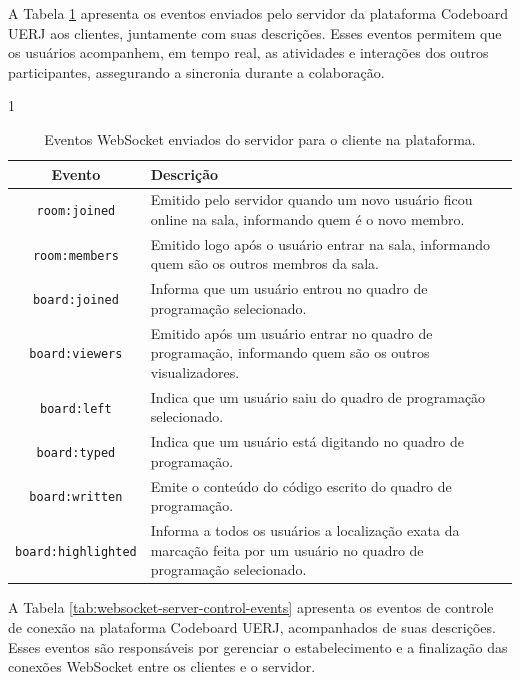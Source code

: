 A Tabela \ref{tab:websocket-server-to-client-events} apresenta os eventos enviados pelo servidor da plataforma Codeboard UERJ aos clientes, juntamente com suas descrições. Esses eventos permitem que os usuários acompanhem, em tempo real, as atividades e interações dos outros participantes, assegurando a sincronia durante a colaboração.

\begin{table}[H]{1\textwidth}
    \centering
    \caption{Eventos WebSocket enviados do servidor para o cliente na plataforma.}
    \label{tab:websocket-server-to-client-events}
    \renewcommand{\arraystretch}{1.3} 
    \begin{tabular}{|c|p{10cm}|}
        \hline
        \textbf{Evento} & \textbf{Descrição} \\
        \hline
        \texttt{room:joined} & Emitido pelo servidor quando um novo usuário ficou online na sala, informando quem é o novo membro. \\
        \hline
        \texttt{room:members} & Emitido logo após o usuário entrar na sala, informando quem são os outros membros da sala. \\
        \hline
        \texttt{board:joined} & Informa que um usuário entrou no quadro de programação selecionado. \\
        \hline
        \texttt{board:viewers} & Emitido após um usuário entrar no quadro de programação, informando quem são os outros visualizadores. \\
        \hline
        \texttt{board:left} & Indica que um usuário saiu do quadro de programação selecionado. \\
        \hline
        \texttt{board:typed} & Indica que um usuário está digitando no quadro de programação. \\
        \hline
        \texttt{board:written} & Emite o conteúdo do código escrito do quadro de programação. \\
        \hline
        \texttt{board:highlighted} & Informa a todos os usuários a localização exata da marcação feita por um usuário no quadro de programação selecionado. \\
        \hline
    \end{tabular}
\end{table}

A Tabela \ref{tab:websocket-server-control-events} apresenta os eventos de controle de conexão na plataforma Codeboard UERJ, acompanhados de suas descrições. Esses eventos são responsáveis por gerenciar o estabelecimento e a finalização das conexões WebSocket entre os clientes e o servidor.

